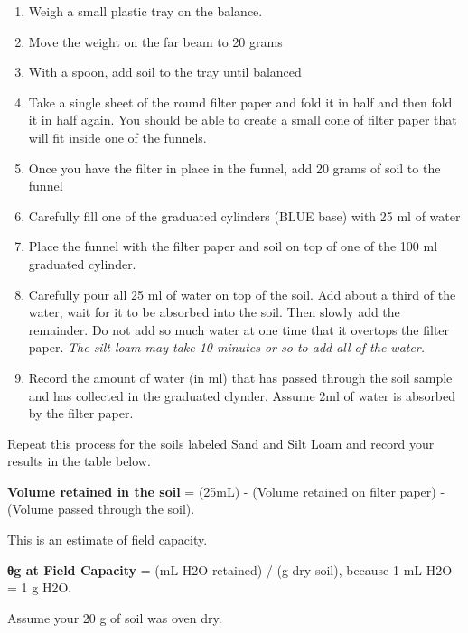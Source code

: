 \documentclass[
  letterpaper,
  twocolumn,
  portrait]{scrbook}
\providecommand{\tightlist}{%
  \setlength{\itemsep}{0pt}\setlength{\parskip}{0pt}}\usepackage{longtable,booktabs,array}
\begin{document}
\begin{enumerate}
\def\labelenumi{\arabic{enumi}.}
\tightlist
\item
  Weigh a small plastic tray on the balance.
\item
  Move the weight on the far beam to 20 grams
\item
  With a spoon, add soil to the tray until balanced
\item
  Take a single sheet of the round filter paper and fold it in half and
  then fold it in half again. You should be able to create a small cone
  of filter paper that will fit inside one of the funnels.
\item
  Once you have the filter in place in the funnel, add 20 grams of soil
  to the funnel
\item
  Carefully fill one of the graduated cylinders (BLUE base) with 25 ml
  of water
\item
  Place the funnel with the filter paper and soil on top of one of the
  100 ml graduated cylinder.
\item
  Carefully pour all 25 ml of water on top of the soil. Add about a
  third of the water, wait for it to be absorbed into the soil. Then
  slowly add the remainder. Do not add so much water at one time that it
  overtops the filter paper. \emph{The silt loam may take 10 minutes or
  so to add all of the water.}
\item
  Record the amount of water (in ml) that has passed through the soil
  sample and has collected in the graduated clynder. Assume 2ml of water
  is absorbed by the filter paper.
\end{enumerate}

Repeat this process for the soils labeled Sand and Silt Loam and record
your results in the table below.

\textbf{Volume retained in the soil} = (25mL) - (Volume retained on
filter paper) - (Volume passed through the soil).

This is an estimate of field capacity.

\textbf{θg at Field Capacity} = (mL H2O retained) / (g dry soil),
because 1 mL H2O = 1 g H2O.

Assume your 20 g of soil was oven dry.

 
  \providecommand{\huxb}[2]{\arrayrulecolor[RGB]{#1}\global\arrayrulewidth=#2pt}
  \providecommand{\huxvb}[2]{\color[RGB]{#1}\vrule width #2pt}
  \providecommand{\huxtpad}[1]{\rule{0pt}{#1}}
  \providecommand{\huxbpad}[1]{\rule[-#1]{0pt}{#1}}
\end{document}
